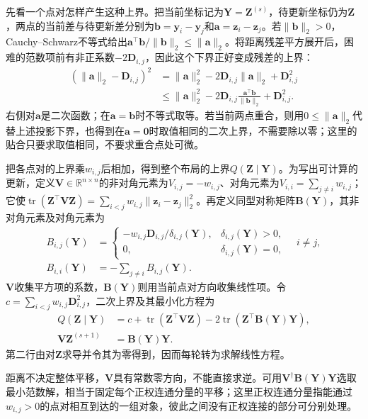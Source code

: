先看一个点对怎样产生这种上界。把当前坐标记为$\bm Y=\bm Z^{(s)}$，待更新坐标仍为$\bm Z$，两点的当前差与待更新差分别为$\bm b=\bm y_i-\bm y_j$和$\bm a=\bm z_i-\bm z_j$。若$\lVert\bm b\rVert_2>0$，Cauchy--Schwarz不等式给出$\bm a^\top\bm b/\lVert\bm b\rVert_2\leq\lVert\bm a\rVert_2$。将距离残差平方展开后，困难的范数项前有非正系数$-2\bm D_{i,j}$，因此这个下界正好变成残差的上界：
\[
 \begin{aligned}
 (\lVert\bm a\rVert_2-\bm D_{i,j})^2
 &=\lVert\bm a\rVert_2^2
       -2\bm D_{i,j}\lVert\bm a\rVert_2+\bm D_{i,j}^2\\
 &\leq\lVert\bm a\rVert_2^2
       -2\bm D_{i,j}
           \frac{\bm a^\top\bm b}{\lVert\bm b\rVert_2}
       +\bm D_{i,j}^2.
 \end{aligned}
\]
右侧对$\bm a$是二次函数；在$\bm a=\bm b$时不等式取等。若当前两点重合，则用$0\leq\lVert\bm a\rVert_2$代替上述投影下界，也得到在$\bm a=\bm0$时取值相同的二次上界，不需要除以零；这里的贴合只要求取值相同，不要求重合点处可微。

把各点对的上界乘$w_{i,j}$后相加，得到整个布局的上界$Q(\bm Z\mid\bm Y)$。为写出可计算的更新，定义$\bm V\in\mathbb R^{n\times n}$的非对角元素为$V_{i,j}=-w_{i,j}$、对角元素为$V_{i,i}=\sum_{j\ne i}w_{i,j}$；它使$\operatorname{tr}(\bm Z^\top\bm V\bm Z)=\sum_{i<j}w_{i,j}\lVert\bm z_i-\bm z_j\rVert_2^2$。再定义同型对称矩阵$\bm B(\bm Y)$，其非对角元素及对角元素为
\[
 \begin{aligned}
 B_{i,j}(\bm Y)
 &=\begin{cases}
 -w_{i,j}\bm D_{i,j}/\delta_{i,j}(\bm Y),
       &\delta_{i,j}(\bm Y)>0,\\
 0,    &\delta_{i,j}(\bm Y)=0,
 \end{cases}\quad i\ne j,\\
 B_{i,i}(\bm Y)&=-\sum_{j\ne i}B_{i,j}(\bm Y).
 \end{aligned}
\]
$\bm V$收集平方项的系数，$\bm B(\bm Y)$则用当前点对方向收集线性项。令$c=\sum_{i<j}w_{i,j}\bm D_{i,j}^2$，二次上界及其最小化方程为
\[
 \begin{aligned}
 Q(\bm Z\mid\bm Y)
 &=c+\operatorname{tr}(\bm Z^\top\bm V\bm Z)
       -2\operatorname{tr}(\bm Z^\top\bm B(\bm Y)\bm Y),\\
 \bm V\bm Z^{(s+1)}&=\bm B(\bm Y)\bm Y.
 \end{aligned}
\]
第二行由对$\bm Z$求导并令其为零得到，因而每轮转为求解线性方程。

距离不决定整体平移，$\bm V$具有常数零方向，不能直接求逆。可用$\bm V^\dagger\bm B(\bm Y)\bm Y$选取最小范数解，相当于固定每个正权连通分量的平移；这里正权连通分量指能通过$w_{i,j}>0$的点对相互到达的一组对象，彼此之间没有正权连接的部分可分别处理。

